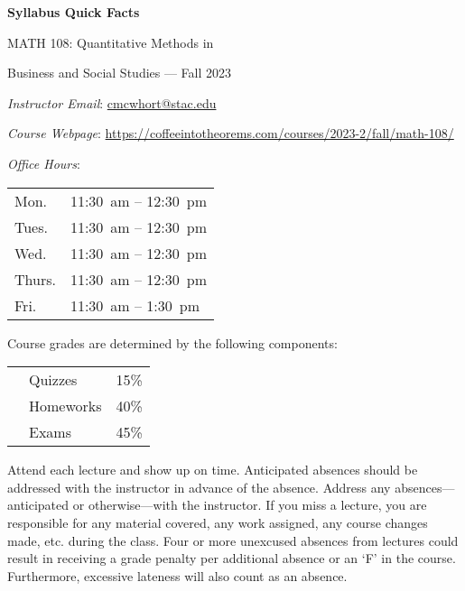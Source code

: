 \documentclass[11pt,letterpaper]{article}
\begin{document}
\begin{center} 
\bfseries
\color{stacred}
\LARGE Syllabus Quick Facts \par\vspace{0.2\baselineskip}
\Large MATH 108: Quantitative Methods in \par Business and Social Studies --- Fall 2023
\end{center} \pspace


\hspace{0.53cm} {\itshape Instructor Email}: \href{mailto:cmcwhort@stac.edu}{cmcwhort@stac.edu} \par
\hspace{0.53cm} {\itshape Course Webpage}: \href{https://coffeeintotheorems.com/courses/2023-2/fall/math-108/}{https://coffeeintotheorems.com/courses/2023-2/fall/math-108/} \par
\hspace{0.53cm} {\itshape Office Hours}: 	\par \vspace{-0.3cm}
	\begin{table}[!ht]
	\centering
	\begin{tabular}{l || l}
	Mon. & 11:30~am -- 12:30~pm \\
	Tues. & 11:30~am -- 12:30~pm \\
	Wed. & 11:30~am -- 12:30~pm \\
	Thurs. & 11:30~am -- 12:30~pm \\
	Fri. & 11:30~am -- 1:30~pm
	\end{tabular}
	\end{table}


Course grades are determined by the following components: \par \vspace{-0.3cm}
	\begin{table}[!ht]
        \begin{tabular}{clr}
	& Quizzes & 15\% \\
	& Homeworks & 40\% \\
	& Exams & 45\%
        \end{tabular} 
        \end{table}


Attend each lecture and show up on time. Anticipated absences should be addressed with the instructor in advance of the absence. Address any absences---anticipated or otherwise---with the instructor. If you miss a lecture, you are responsible for any material covered, any work assigned, any course changes made, etc. during the class. Four or more unexcused absences from lectures could result in receiving a grade penalty per additional absence or an `F' in the course. Furthermore, excessive lateness will also count as an absence. \pspace
\end{document}
